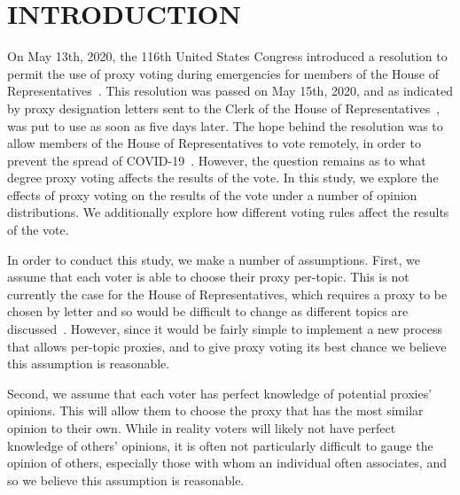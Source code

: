 %
%

\chapter{INTRODUCTION}\label{ch:introduction}
\thispagestyle{empty}

On May 13th, 2020, the 116th United States Congress introduced a resolution
to permit the use of proxy voting during emergencies for members of the House of
Representatives~\cite{Congress.gov2020}.
This resolution was passed on May 15th, 2020, and as indicated by proxy designation
letters sent to the Clerk of the House of Representatives~\cite{Clerk.House.gov2022},
was put to use as soon as five days later.
The hope behind the resolution was to allow members of the House of Representatives
to vote remotely, in order to prevent the spread of COVID-19~\cite{Congress.gov2020}.
However, the question remains as to what degree proxy voting affects the results of
the vote.
In this study, we explore the effects of proxy voting on the results of the vote
under a number of opinion distributions.
We additionally explore how different voting rules affect the results of the vote.


In order to conduct this study, we make a number of assumptions.
First, we assume that each voter is able to choose their proxy per-topic.
This is not currently the case for the House of Representatives, which requires
a proxy to be chosen by letter and so would be difficult to change as different
topics are discussed~\cite{Congress.gov2020}.
However, since it would be fairly simple to implement a new process that allows
per-topic proxies, and to give proxy voting its best chance we believe this assumption
is reasonable.

Second, we assume that each voter has perfect knowledge of potential proxies' opinions.
This will allow them to choose the proxy that has the most similar opinion to their own.
While in reality voters will likely not have perfect knowledge of others' opinions,
it is often not particularly difficult to gauge the opinion of others, especially
those with whom an individual often associates, and so we believe this assumption is
reasonable.

